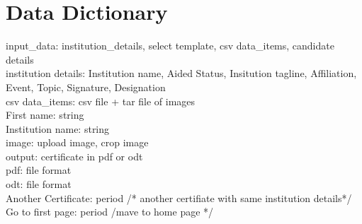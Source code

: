 \section*{Data Dictionary}
input\_data: institution\_details, select template, csv data\_items, candidate details\\
institution details: Institution name, Aided Status, Insitution tagline, Affiliation, Event, Topic, Signature, Designation\\
csv data\_items: csv file + tar file of images\\
First name: string\\
Institution name: string\\
image: upload image, crop image\\
output: certificate in pdf or odt\\
pdf: file format\\
odt: file format\\
Another Certificate: period /* another certifiate with same institution details*/\\
Go to first page: period /mave to home page */\\



 

